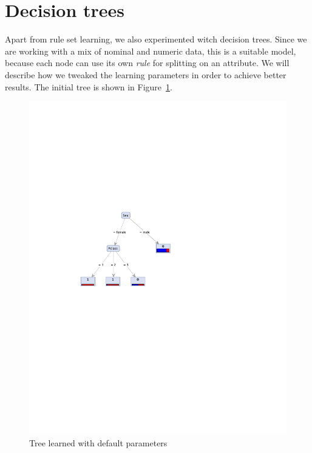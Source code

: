 \documentclass[12pt,a4paper]{article}
\begin{document}
\section{Decision trees}

Apart from rule set learning, we also experimented witch decision trees. Since we are working with a mix of nominal and numeric data, this is a suitable model, because each node can use its own \emph{rule} for splitting on an attribute. We will describe how we tweaked the learning parameters in order to achieve better results. The initial tree is shown in Figure~\ref{fig:tree_initial}.


\begin{figure}[htbp]
  \centering
  \includegraphics[width = .6\textwidth]{tree_initial}
  \captionsetup{width=.8\textwidth}
  \caption{Tree learned with default parameters}
  \label{fig:tree_initial}
\end{figure}
\end{document}
